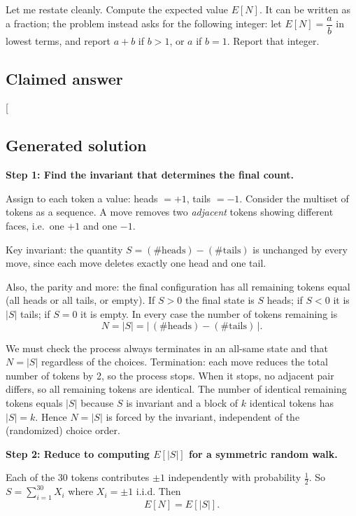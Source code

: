 \documentclass[
  11pt,
  letterpaper,
]{article}
\begin{document}
Let me restate cleanly. Compute the expected value \(E[N]\). It can be
written as a fraction; the problem instead asks for the following
integer: let \(E[N]=\dfrac{a}{b}\) in lowest terms, and report \(a+b\)
if \(b>1\), or \(a\) if \(b=1\). Report that integer.

\subsection{Claimed answer}\label{claimed-answer-11}

{[}\boxed{236}{]}

\subsection{Generated solution}\label{generated-solution-11}

\textbf{Step 1: Find the invariant that determines the final count.}

Assign to each token a value: heads \(=+1\), tails \(=-1\). Consider the
multiset of tokens as a sequence. A move removes two \emph{adjacent}
tokens showing different faces, i.e.~one \(+1\) and one \(-1\).

Key invariant: the quantity \(S=(\#\text{heads})-(\#\text{tails})\) is
unchanged by every move, since each move deletes exactly one head and
one tail.

Also, the parity and more: the final configuration has all remaining
tokens equal (all heads or all tails, or empty). If \(S>0\) the final
state is \(S\) heads; if \(S<0\) it is \(|S|\) tails; if \(S=0\) it is
empty. In every case the number of tokens remaining is
\[N=|S|=|\,(\#\text{heads})-(\#\text{tails})\,|.\]

We must check the process always terminates in an all-same state and
that \(N=|S|\) regardless of the choices. Termination: each move reduces
the total number of tokens by 2, so the process stops. When it stops, no
adjacent pair differs, so all remaining tokens are identical. The number
of identical remaining tokens equals \(|S|\) because \(S\) is invariant
and a block of \(k\) identical tokens has \(|S|=k\). Hence \(N=|S|\) is
forced by the invariant, independent of the (randomized) choice order.

\textbf{Step 2: Reduce to computing \(E[|S|]\) for a symmetric random
walk.}

Each of the 30 tokens contributes \(\pm1\) independently with
probability \(\tfrac12\). So \(S=\sum_{i=1}^{30}X_i\) where \(X_i=\pm1\)
i.i.d. Then \[E[N]=E[|S|].\]
\end{document}
